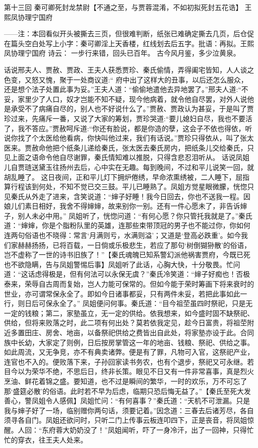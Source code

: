\documentclass[12pt,oneside]{book}
\begin{document}
 
第十三回  秦可卿死封龙禁尉【不通之至，与贾蓉混淆，不如初拟死封五花诰】
王熙凤协理宁国府


——注：本回看似开头被撕去三页，但很难判断，纸张已难确定撕去几页，后仓促在篇头空白处写上小字：秦可卿淫上天香楼，红线划去后五字。批语：再拟。王熙凤协理宁国府
诗云：
一步行来错，回头已百年。
古今风月鉴，多少泣黄泉。

话说邢夫人、贾赦、贾政、王夫人获悉贾珍、秦氏偷情，弄得阖宅皆知，人人谈之色变，又怒又愧，聚于一处商议道:“ 府中出了这样大的丑事，以后还怎么服众，还是想个法子处置此事为妥。”王夫人道：“偷偷地遣他去异地罢了。”邢夫人道:“不妥，家里少了人口，奴才岂能不知不疑，现今他病着，就令他自尽罢，对外人说他是承受不了病痛自尽的，别人也不好说什么了。”贾赦、贾政认为甚妥，于是叫了贾珍过来，先痛斥一番，又说了大家的筹划，贾珍哭道:“要儿媳妇自尽，我也不要活了，我不答应。”贾赦呵斥道:“你还有脸说，都是你造的孽，这会子不依也得依，听说你找了个太医给他看病，你快叫他过来，我们有话说。”贾珍只得依从，叫了张太医来。贾赦命他把个纸条儿递给秦氏，张太医去秦氏房内，把纸条儿交给秦氏，只见上面之语命令他自尽谢罪，秦氏情知难以推脱，只得含悲忍泪听从。
话说凤姐儿自贾琏送黛玉往扬州去后，心中实在无趣。每到晚间，不过和平儿说笑一回，就胡乱睡了。
这日夜间，正和平儿灯下拥炉倦绣，早命浓熏绣被，二人睡下，屈指算行程该到何处，不知不觉已交三鼓。平儿已睡熟了。凤姐方觉星眼微朦，恍惚只见秦氏从外走了进来，含笑说道：“婶子好睡！我今日回去，你也不送我一程。因娘儿们素日相好，我舍不得婶婶，故来别你一别。还有一件心愿未了，非告诉婶子，别人未必中用。”
凤姐听了，恍惚问道：“有何心愿？你只管托我就是了。”秦氏道：“婶婶，你是个脂粉队里的英雄，连那些束带顶冠的男子也不能过你，你如何连两句俗语也不晓得：常言‘月满则亏，水满则溢’；又道是‘登高必跌重’。如今我们家赫赫扬扬，已将百载，一日倘或乐极悲生，若应了那句‘树倒猢狲散’的俗语，岂不虚称了一世的诗书旧族了！”【秦氏魂魄已知系警幻派他祸害贾府，今既已死也不欲隐瞒，告与凤姐警惕后事】凤姐听了此话，心胸大快，十分敬畏。忙问道：“这话虑得极是，但有何法可以永保无虞？”秦氏冷笑道：“婶子好痴也！否极泰来，荣辱自古周而复始，岂人力能可保常的。但如今能于荣时筹画下将来衰时的世业，亦可谓常保永全了。即如今日诸事都妥，只有两件未妥，若把此事如此一行，则日后可保永全了。”
凤姐便问何事。秦氏道：“目今祖茔虽四时祭祀，只是无一定的钱粮；第二，家塾虽立，无一定的供给。依我想来，如今盛时固不缺祭祀、供给，但将来败落之时，此二项有何出处？莫若依我定见，趁今日富贵，将祖茔附近多置田庄、房舍、地亩，以备祭祀供给之费皆出自此处，将家塾亦设于此。合同族中长幼，大家定了则例，日后按房掌管这一年的地亩、钱粮、祭祀、供给之事。如此周流，又无争竞，亦不有典卖诸弊。便是有了罪，凡物可入官，这祭祀产业，连官也不入的。便败落下来，子孙回家读书务农，也有个退步，祭祀又可永继。若目今以为荣华不绝，不思后日，终非长策。眼见不日又有一件非常喜事，真是烈火烹油、鲜花着锦之盛。要知道，也不过是瞬间的繁华，一时的欢乐，万不可忘了那‘盛筵必散’的俗语。此时若不早为后虑，临期只恐后悔无益了。”【秦氏至死大发善心，警凤姐令人感佩】凤姐忙问：“有何喜事？”秦氏道：“天机不可泄漏。只是我与婶子好了一场，临别赠你两句话，须要记着。”因念道：三春去后诸芳尽，各自须寻各自门。凤姐还欲问时，只听二门上传事云板连叩四下，正是丧音，将凤姐惊醒。人回：“东府蓉大奶奶没了！”凤姐闻听，吓了一身冷汗，出了一回神，只得忙忙的穿衣，往王夫人处来。
\end{document}
